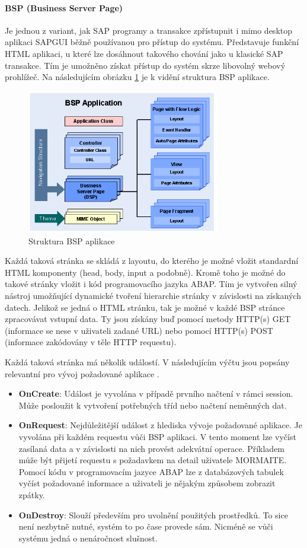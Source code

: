\documentclass[thesis=M,czech]{FITthesis}[2012/06/26]
\begin{document}
\paragraph{BSP (Business Server Page)} Je jednou z variant, jak SAP programy a transakce zpřístupnit i mimo desktop aplikaci SAPGUI běžně používanou pro přístup do systému. Představuje funkční HTML aplikaci, u které lze dosáhnout takového chování jako u klasické SAP transakce. Tím je umožněno získat přístup do systém skrze libovolný webový prohlížeč. Na následujícím obrázku \ref{img:bsp_structure} je k vidění struktura BSP aplikace. 
\begin{figure}[H]
	\centering
	\includegraphics[width=0.75\textwidth]{images/bsp.png}
	\caption{Struktura BSP aplikace \cite{sap_bsp}}
	\label{img:bsp_structure}
\end{figure}
Každá taková stránka se skládá z layoutu, do kterého je možné vložit standardní HTML komponenty (head, body, input a podobně). Kromě toho je možné do takové stránky vložit i kód programovacího jazyka ABAP. Tím je vytvořen silný nástroj umožňující dynamické tvoření hierarchie stránky v závislosti na získaných datech. Jelikož se jedná o HTML stránku, tak je možné v každé BSP stránce zpracovávat vstupní data. Ty jsou získány buď pomocí metody HTTP(s) GET (informace se nese v uživateli zadané URL) nebo pomocí HTTP(s) POST (informace zakódovány v těle HTTP requestu).

Každá taková stránka má několik událostí. V následujícím výčtu jsou popsány relevantní pro vývoj požadované aplikace \cite{sap_bsp}. 
\begin{itemize}
	\item
	\textbf{OnCreate}: Událost je vyvolána v případě prvního načtení v rámci session. Může posloužit k vytvoření potřebných tříd nebo načtení neměnných dat.
	\item
	\textbf{OnRequest}: Nejdůležitější událost z hlediska vývoje požadované aplikace. Je vyvolána při každém requestu vůči BSP aplikaci. V tento moment lze vyčíst zasílaná data a v závislosti na nich provést adekvátní operace. Příkladem může být přijetí requestu s požadavkem na detail uživatele MORMAITE. Pomocí kódu v programovacím jazyce ABAP lze z databázových tabulek vyčíst požadované informace a uživateli je nějakým způsobem zobrazit zpátky.
	\item
	\textbf{OnDestroy}: Slouží především pro uvolnění použitých prostředků. To sice není nezbytně nutné, systém to po čase provede sám. Nicméně se vůči systému jedná o nenáročnost slušnost.
\end{itemize} 
\end{document}
